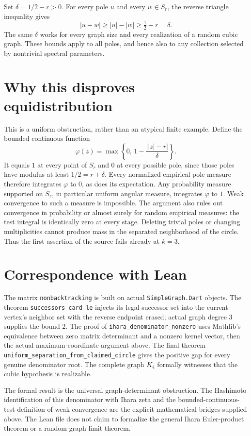 \documentclass[11pt]{article}
\begin{document}
Set $\delta=1/2-r>0$. For every pole $u$ and every $w\in S_r$,
the reverse triangle inequality gives
\[
 |u-w|\ge |u|-|w|\ge\tfrac12-r=\delta.
\]
The same $\delta$ works for every graph size and every realization
of a random cubic graph. These bounds apply to all poles, and hence
also to any collection selected by nontrivial spectral parameters.

\section*{Why this disproves equidistribution}
This is a uniform obstruction, rather than an atypical finite example.
Define the bounded continuous function
\[
 \varphi(z)=\max\left\{0,\,1-
          \frac{\bigl||z|-r\bigr|}{\delta}\right\}.
\]
It equals $1$ at every point of $S_r$ and $0$ at every possible pole,
since those poles have modulus at least $1/2=r+\delta$.
Every normalized empirical pole measure therefore integrates
$\varphi$ to $0$, as does its expectation. Any probability measure
supported on $S_r$, in particular uniform angular measure, integrates
$\varphi$ to $1$. Weak convergence to such a measure is impossible.
The argument also rules out convergence in probability or almost
surely for random empirical measures: the test integral is identically
zero at every stage. Deleting trivial poles or changing multiplicities
cannot produce mass in the separated neighborhood of the circle.
Thus the first assertion of the source fails already at $k=3$.

\section*{Correspondence with Lean}
The matrix \texttt{nonbacktracking} is built on actual
\texttt{SimpleGraph.Dart} objects. The theorem
\texttt{successors\_\allowbreak{}card\_\allowbreak{}le} injects its legal successor set into
the current vertex's neighbor set with the reverse endpoint erased;
actual graph degree $3$ supplies the bound $2$.
The proof of \texttt{ihara\_\allowbreak{}denominator\_\allowbreak{}nonzero} uses Mathlib's
equivalence between zero matrix determinant and a nonzero kernel
vector, then the actual maximum-coordinate argument above.
The final theorem \texttt{uniform\_\allowbreak{}separation\_\allowbreak{}from\_\allowbreak{}claimed\_\allowbreak{}circle}
gives the positive gap for every genuine denominator root.
The complete graph $K_4$ formally witnesses that the cubic hypothesis
is realizable.

The formal result is the universal graph-determinant obstruction.
The Hashimoto identification of this denominator with Ihara zeta and
the bounded-continuous-test definition of weak convergence are the
explicit mathematical bridges supplied above. The Lean file does not
claim to formalize the general Ihara Euler-product theorem or a
random-graph limit theorem.
\end{document}
